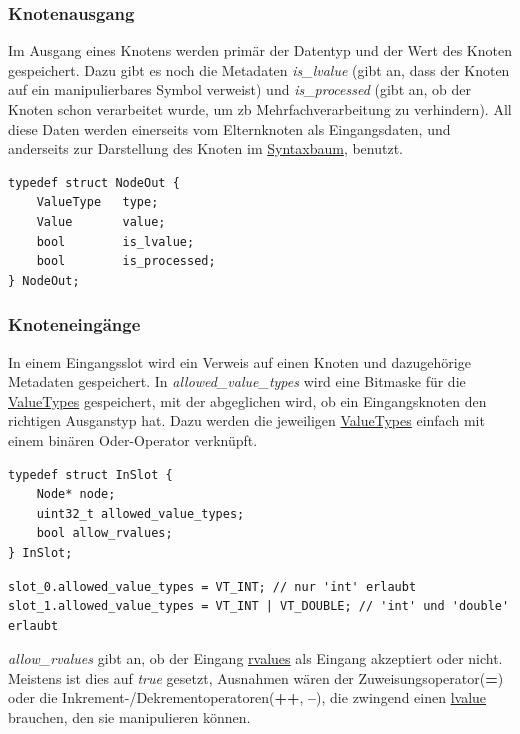 \documentclass[oneside]{ausarbeitung}
\begin{document}
\subsubsection{Knotenausgang}
\label{sub:node_out}
Im Ausgang eines Knotens werden primär der Datentyp und der Wert des Knoten gespeichert. Dazu gibt es noch die Metadaten \textit{is\_lvalue} (gibt an, dass der Knoten auf ein manipulierbares Symbol verweist) und \textit{is\_processed} (gibt an, ob der Knoten schon verarbeitet wurde, um \ac{zb} Mehrfachverarbeitung zu verhindern). All diese Daten werden einerseits vom Elternknoten als Eingangsdaten, und anderseits zur Darstellung des Knoten im \hyperref[sub:syntax_tree]{Syntaxbaum}, benutzt.
\begin{lstlisting}[label={lst:NodeOut}, caption={NodeOut}]
typedef struct NodeOut {
    ValueType   type;
    Value       value;
    bool        is_lvalue;
    bool        is_processed;
} NodeOut;
\end{lstlisting}

\subsubsection{Knoteneingänge}
\label{sub:node_in}
In einem Eingangsslot wird ein Verweis auf einen Knoten und dazugehörige Metadaten gespeichert. In \textit{allowed\_value\_types} wird eine Bitmaske für die \hyperref[sub:value_types]{ValueTypes} gespeichert, mit der abgeglichen wird, ob ein Eingangsknoten den richtigen Ausganstyp hat. Dazu werden die jeweiligen \hyperref[sub:value_types]{ValueTypes} einfach mit einem binären Oder-Operator verknüpft.
\begin{lstlisting}[label={lst:InSlot}, caption={InSlot}]
typedef struct InSlot {
    Node* node;
    uint32_t allowed_value_types;
    bool allow_rvalues;
} InSlot;
\end{lstlisting}

\begin{lstlisting}[label={lst:allowed_value_types}, caption={Verknüpfen von ValueTypes}]
slot_0.allowed_value_types = VT_INT; // nur 'int' erlaubt
slot_1.allowed_value_types = VT_INT | VT_DOUBLE; // 'int' und 'double' erlaubt
\end{lstlisting}
\textit{allow\_rvalues} gibt an, ob der Eingang \hyperref[sub:lvalues_rvalues]{rvalues} als Eingang akzeptiert oder nicht. Meistens ist dies auf \textit{true} gesetzt, Ausnahmen wären der Zuweisungsoperator(\textbf{=}) oder die Inkrement-/Dekrementoperatoren(\textbf{++}, \textbf{--}), die zwingend einen \hyperref[sub:lvalues_rvalues]{lvalue} brauchen, den sie manipulieren können.
\end{document}
